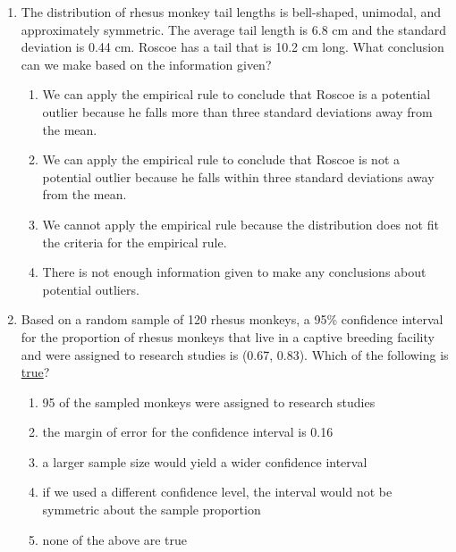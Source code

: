 \documentclass[12pt,fullpage]{amsart}
\begin{document}
\begin{enumerate}
      \vfill
      
\item
The distribution of rhesus monkey tail lengths is bell-shaped, unimodal, and approximately symmetric.  The average tail length is 6.8 cm and the standard deviation is 0.44 cm.  Roscoe has a tail that is 10.2 cm long.  What conclusion can we make based on the information given?
\begin{enumerate}
    \item
    We can apply the empirical rule to conclude that Roscoe is a potential outlier because he falls more than three standard deviations away from the mean.
    \item
	We can apply the empirical rule to conclude that Roscoe is not a potential outlier because he falls within three standard deviations away from the mean.
    \item
	We cannot apply the empirical rule because the distribution does not fit the criteria for the empirical rule.
    \item
      There is not enough information given to make any conclusions about potential outliers.

\end{enumerate} 

      \vfill
      
\item
Based on a random sample of 120 rhesus monkeys, a 95\% confidence interval for the proportion of rhesus monkeys that live in a captive breeding facility and were assigned to research studies is (0.67, 0.83).  Which of the following is \underline{true}?
\begin{enumerate}
\item	95 of the sampled monkeys were assigned to research studies
\item	the margin of error for the confidence interval is 0.16
\item	a larger sample size would yield a wider confidence interval
\item	if we used a different confidence level, the interval would not be symmetric about the sample proportion
\item	none of the above are true
\end{enumerate}

\vfill


\end{enumerate}
\end{document}
